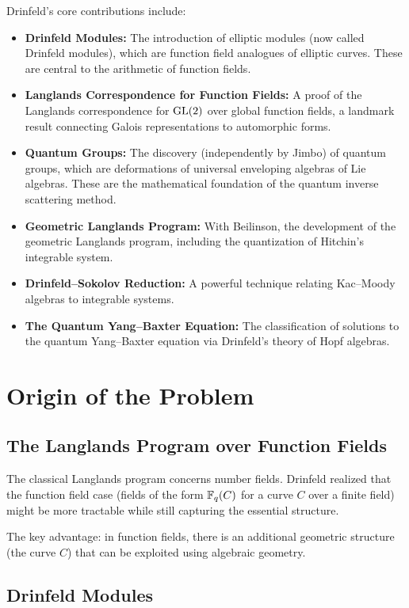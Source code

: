 Drinfeld's core contributions include:
\begin{itemize}
    \item \textbf{Drinfeld Modules:} The introduction of elliptic modules (now called Drinfeld modules), which are function field analogues of elliptic curves. These are central to the arithmetic of function fields.
    \item \textbf{Langlands Correspondence for Function Fields:} A proof of the Langlands correspondence for $\operatorname{GL}(2)$ over global function fields, a landmark result connecting Galois representations to automorphic forms.
    \item \textbf{Quantum Groups:} The discovery (independently by Jimbo) of quantum groups, which are deformations of universal enveloping algebras of Lie algebras. These are the mathematical foundation of the quantum inverse scattering method.
    \item \textbf{Geometric Langlands Program:} With Beilinson, the development of the geometric Langlands program, including the quantization of Hitchin's integrable system.
    \item \textbf{Drinfeld--Sokolov Reduction:} A powerful technique relating Kac--Moody algebras to integrable systems.
    \item \textbf{The Quantum Yang--Baxter Equation:} The classification of solutions to the quantum Yang--Baxter equation via Drinfeld's theory of Hopf algebras.
\end{itemize}

\section{Origin of the Problem}

\subsection{The Langlands Program over Function Fields}

The classical Langlands program concerns number fields. Drinfeld realized that the function field case (fields of the form $\mathbb{F}_q(C)$ for a curve $C$ over a finite field) might be more tractable while still capturing the essential structure.

The key advantage: in function fields, there is an additional geometric structure (the curve $C$) that can be exploited using algebraic geometry.

\subsection{Drinfeld Modules}

